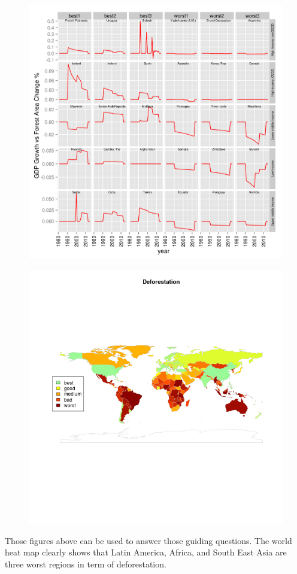 \documentclass{article}
\begin{document}
\pagebreak
\begin{figure}[h]
\includegraphics[scale=0.8]{forest_by_income.png}
\end{figure}
\pagebreak
\begin{figure}[h]
\includegraphics[scale=0.5]{wmap.png}
\end{figure}
Those figures above can be used to answer those guiding questions. The world heat map clearly shows that Latin America, Africa, and South East Asia are three worst regions in term of deforestation. 
\end{document}
